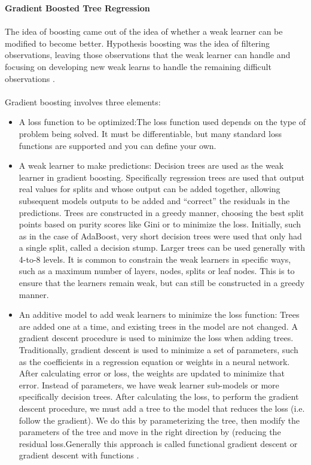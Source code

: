 \textbf{Gradient Boosted Tree Regression}\\\\
The idea of boosting came out of the idea of whether a weak learner can be modified to become
better. Hypothesis boosting was the idea of filtering observations, leaving those observations
that the weak learner can handle and focusing on developing new weak learns to handle the
remaining difficult observations \cite{Brownlee2016}.\\\\
Gradient boosting involves three elements:\\
\begin{itemize}
\item A loss function to be optimized:The loss function used depends on the type of problem
being solved. It must be differentiable, but many standard loss functions are supported
and you can define your own.
\item A weak learner to make predictions: Decision trees are used as the weak learner in
gradient boosting. Specifically regression trees are used that output real values for splits
and whose output can be added together, allowing subsequent models outputs to be
added and “correct” the residuals in the predictions. Trees are constructed in a greedy
manner, choosing the best split points based on purity scores like Gini or to minimize the
loss. Initially, such as in the case of AdaBoost, very short decision trees were used that
only had a single split, called a decision stump. Larger trees can be used generally with
4-to-8 levels. It is common to constrain the weak learners in specific ways, such as a
maximum number of layers, nodes, splits or leaf nodes. This is to ensure that the
learners remain weak, but can still be constructed in a greedy manner.
\item An additive model to add weak learners to minimize the loss function: Trees are added
one at a time, and existing trees in the model are not changed. A gradient descent
procedure is used to minimize the loss when adding trees. Traditionally, gradient descent
is used to minimize a set of parameters, such as the coefficients in a regression equation
or weights in a neural network. After calculating error or loss, the weights are updated to
minimize that error. Instead of parameters, we have weak learner sub-models or more
specifically decision trees. After calculating the loss, to perform the gradient descent
procedure, we must add a tree to the model that reduces the loss (i.e. follow the gradient). We do this by parameterizing the tree, then modify the parameters of the tree
and move in the right direction by (reducing the residual loss.Generally this approach is
called functional gradient descent or gradient descent with functions \cite{Brownlee2016}.
\end{itemize}
